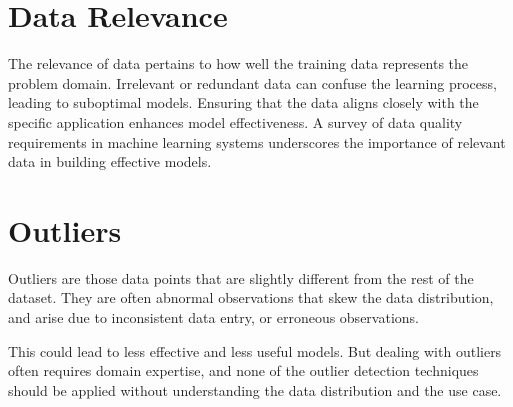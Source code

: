 \section{Data Relevance}

The relevance of data pertains to how well the training data represents the problem domain. Irrelevant or redundant data can confuse the learning process, leading to suboptimal models. Ensuring that the data aligns closely with the specific application enhances model effectiveness. A survey of data quality requirements in machine learning systems underscores the importance of relevant data in building effective models.\cite{Priestley:2023}

\section{Outliers}

Outliers are those data points that are slightly different from the
rest of the dataset. They are often abnormal observations that skew
the data distribution, and arise due to inconsistent data entry, or
erroneous observations.\cite{C:2022}

This could lead to less effective and less useful models.
But dealing with outliers often requires domain expertise, and none of
the outlier detection techniques should be applied without
understanding the data distribution and the use case.

\begin{center}
	\label{fig:Outlier Detection}
\end{center}

